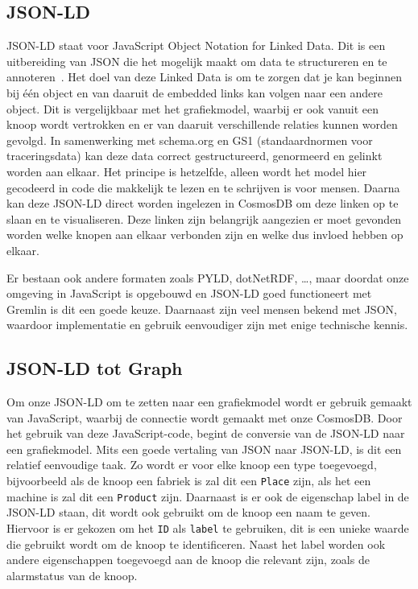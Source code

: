 \subsection{JSON-LD}
JSON-LD staat voor JavaScript Object Notation for Linked Data. Dit is een uitbereiding van JSON die het mogelijk maakt om data te structureren en te annoteren~\autocite{jsonld.org}.
Het doel van deze Linked Data is om te zorgen dat je kan beginnen bij één object en van daaruit de embedded links kan volgen naar een andere object. 
Dit is vergelijkbaar met het grafiekmodel, waarbij er ook vanuit een knoop wordt vertrokken en er van daaruit verschillende relaties kunnen worden gevolgd.
In samenwerking met schema.org en GS1 (standaardnormen voor traceringsdata) kan deze data correct gestructureerd, genormeerd en gelinkt worden aan elkaar.
Het principe is hetzelfde, alleen wordt het model hier gecodeerd in code die makkelijk te lezen en te schrijven is voor mensen. 
Daarna kan deze JSON-LD direct worden ingelezen in CosmosDB om deze linken op te slaan en te visualiseren.
Deze linken zijn belangrijk aangezien er moet gevonden worden welke knopen aan elkaar verbonden zijn en welke dus invloed hebben op elkaar.

Er bestaan ook andere formaten zoals PYLD, dotNetRDF, \dots, maar doordat onze omgeving in JavaScript is opgebouwd en JSON-LD goed functioneert met Gremlin is dit een goede keuze.
Daarnaast zijn veel mensen bekend met JSON, waardoor implementatie en gebruik eenvoudiger zijn met enige technische kennis.

\subsection{JSON-LD tot Graph}
Om onze JSON-LD om te zetten naar een grafiekmodel wordt er gebruik gemaakt van JavaScript, waarbij de connectie wordt gemaakt met onze CosmosDB.\@
Door het gebruik van deze JavaScript-code, begint de conversie van de JSON-LD naar een grafiekmodel. Mits een goede vertaling van JSON naar JSON-LD, is dit een relatief eenvoudige taak.
Zo wordt er voor elke knoop een type toegevoegd, bijvoorbeeld als de knoop een fabriek is zal dit een \texttt{Place} zijn, als het een machine is zal dit een \texttt{Product} zijn.
Daarnaast is er ook de eigenschap label in de JSON-LD staan, dit wordt ook gebruikt om de knoop een naam te geven.
Hiervoor is er gekozen om het \texttt{ID} als \texttt{label} te gebruiken, dit is een unieke waarde die gebruikt wordt om de knoop te identificeren.
Naast het label worden ook andere eigenschappen toegevoegd aan de knoop die relevant zijn, zoals de alarmstatus van de knoop.\@


